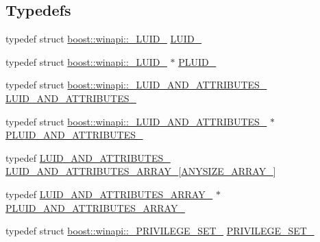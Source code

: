 \subsection*{Typedefs}
\begin{DoxyCompactItemize}
\item 
typedef struct \mbox{\hyperlink{structboost_1_1winapi_1_1___l_u_i_d__}{boost\+::winapi\+::\+\_\+\+L\+U\+I\+D\+\_\+}} \mbox{\hyperlink{namespaceboost_1_1winapi_aeabc0bea0a606e83e4fab8767dfc38db}{L\+U\+I\+D\+\_\+}}
\item 
typedef struct \mbox{\hyperlink{structboost_1_1winapi_1_1___l_u_i_d__}{boost\+::winapi\+::\+\_\+\+L\+U\+I\+D\+\_\+}} $\ast$ \mbox{\hyperlink{namespaceboost_1_1winapi_a9c163fdf2c6f3909b7d5af5652bc6727}{P\+L\+U\+I\+D\+\_\+}}
\item 
typedef struct \mbox{\hyperlink{structboost_1_1winapi_1_1___l_u_i_d___a_n_d___a_t_t_r_i_b_u_t_e_s__}{boost\+::winapi\+::\+\_\+\+L\+U\+I\+D\+\_\+\+A\+N\+D\+\_\+\+A\+T\+T\+R\+I\+B\+U\+T\+E\+S\+\_\+}} \mbox{\hyperlink{namespaceboost_1_1winapi_af4681939403ad850eb8126605919a03c}{L\+U\+I\+D\+\_\+\+A\+N\+D\+\_\+\+A\+T\+T\+R\+I\+B\+U\+T\+E\+S\+\_\+}}
\item 
typedef struct \mbox{\hyperlink{structboost_1_1winapi_1_1___l_u_i_d___a_n_d___a_t_t_r_i_b_u_t_e_s__}{boost\+::winapi\+::\+\_\+\+L\+U\+I\+D\+\_\+\+A\+N\+D\+\_\+\+A\+T\+T\+R\+I\+B\+U\+T\+E\+S\+\_\+}} $\ast$ \mbox{\hyperlink{namespaceboost_1_1winapi_a28cfeb5f946e6d523ef67102701c2fb5}{P\+L\+U\+I\+D\+\_\+\+A\+N\+D\+\_\+\+A\+T\+T\+R\+I\+B\+U\+T\+E\+S\+\_\+}}
\item 
typedef \mbox{\hyperlink{namespaceboost_1_1winapi_af4681939403ad850eb8126605919a03c}{L\+U\+I\+D\+\_\+\+A\+N\+D\+\_\+\+A\+T\+T\+R\+I\+B\+U\+T\+E\+S\+\_\+}} \mbox{\hyperlink{namespaceboost_1_1winapi_acb39426150028eb921b975456c452602}{L\+U\+I\+D\+\_\+\+A\+N\+D\+\_\+\+A\+T\+T\+R\+I\+B\+U\+T\+E\+S\+\_\+\+A\+R\+R\+A\+Y\+\_\+}}\mbox{[}\mbox{\hyperlink{namespaceboost_1_1winapi_a7c615455746a3e247ee2b7009dd0101c}{A\+N\+Y\+S\+I\+Z\+E\+\_\+\+A\+R\+R\+A\+Y\+\_\+}}\mbox{]}
\item 
typedef \mbox{\hyperlink{namespaceboost_1_1winapi_acb39426150028eb921b975456c452602}{L\+U\+I\+D\+\_\+\+A\+N\+D\+\_\+\+A\+T\+T\+R\+I\+B\+U\+T\+E\+S\+\_\+\+A\+R\+R\+A\+Y\+\_\+}} $\ast$ \mbox{\hyperlink{namespaceboost_1_1winapi_ac7b855e6c730952e127e2c64f6a24831}{P\+L\+U\+I\+D\+\_\+\+A\+N\+D\+\_\+\+A\+T\+T\+R\+I\+B\+U\+T\+E\+S\+\_\+\+A\+R\+R\+A\+Y\+\_\+}}
\item 
typedef struct \mbox{\hyperlink{structboost_1_1winapi_1_1___p_r_i_v_i_l_e_g_e___s_e_t__}{boost\+::winapi\+::\+\_\+\+P\+R\+I\+V\+I\+L\+E\+G\+E\+\_\+\+S\+E\+T\+\_\+}} \mbox{\hyperlink{namespaceboost_1_1winapi_ad5c3207ffbe8cc6eb36b1f28897f2711}{P\+R\+I\+V\+I\+L\+E\+G\+E\+\_\+\+S\+E\+T\+\_\+}}

\end{DoxyCompactItemize}
